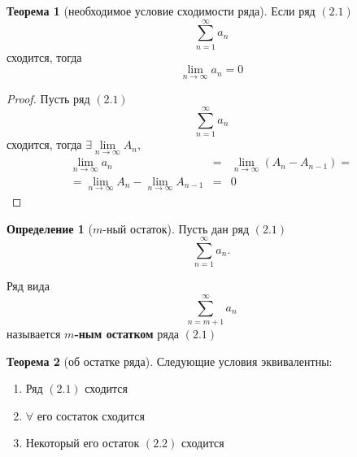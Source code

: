\documentclass{report}
\theoremstyle{definition}
\newtheorem{definition}{Определение}[section]
\newtheorem{theorem}{Теорема}[section]
\begin{document}
\begin{theorem}[необходимое условие сходимости ряда]
  Если ряд $(2.1)$
  \begin{equation*}
    \sum_{n=1}^{\infty}a_n
  \end{equation*}
  сходится, тогда
  \begin{equation*}
    \underset{n\rightarrow\infty}{\lim}a_n = 0
  \end{equation*}
\end{theorem}

\begin{proof}
  Пусть ряд $(2.1)$
  \begin{equation*}
    \sum_{n=1}^{\infty}a_n
  \end{equation*}
  сходится, тогда $\exists \underset{n\rightarrow\infty}{\lim}A_n$,
  \begin{eqnarray*}
    \underset{n\rightarrow\infty}{\lim}a_n &=& \underset{n\rightarrow\infty}{\lim}(A_n - A_{n-1}) = \\
    = \underset{n\rightarrow\infty}{\lim}A_n - \underset{n\rightarrow\infty}{\lim}A_{n-1} &=& 0
  \end{eqnarray*}
\end{proof}

\begin{definition}[$m$-ный остаток]
  Пусть дан ряд $(2.1)$
  \begin{equation*}
    \sum_{n=1}^{\infty}a_n.
  \end{equation*}

  Ряд вида
  \begin{equation}
    \sum_{n=m+1}^{\infty}a_n
  \end{equation}
  называется \textbf{$m$-ным остатком} ряда $(2.1)$
\end{definition}

\begin{theorem}[об остатке ряда]
  Следующие условия эквивалентны:
  \begin{enumerate}
    \item Ряд $(2.1)$ сходится
    \item $\forall$ его состаток сходится
    \item Некоторый его остаток $(2.2)$ сходится
  \end{enumerate}
\end{theorem}
\end{document}
